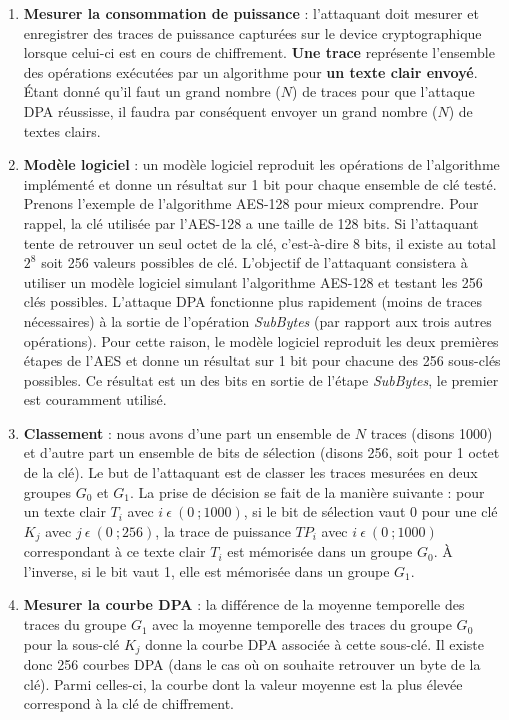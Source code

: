 \documentclass[oneside]{book}
\begin{document}
\begin{enumerate}
\item \textbf{Mesurer la consommation de puissance} : l'attaquant doit mesurer et enregistrer des traces de puissance capturées sur le device cryptographique lorsque celui-ci est en cours de chiffrement. \textbf{Une trace} représente l'ensemble des opérations exécutées par un algorithme pour \textbf{un texte clair envoyé}. Étant donné qu'il faut un grand nombre ($N$) de traces pour que l'attaque DPA réussisse, il faudra par conséquent envoyer un grand nombre ($N$) de textes clairs.
\item \textbf{Modèle logiciel} : un modèle logiciel reproduit les opérations de l’algorithme implémenté et donne un résultat sur 1 bit pour chaque ensemble de clé testé. Prenons l'exemple de l'algorithme AES-128 pour mieux comprendre. Pour rappel, la clé utilisée par l'AES-128 a une taille de 128 bits. Si l'attaquant tente de retrouver un seul octet de la clé, c'est-à-dire 8 bits, il existe au total $2^{8}$ soit 256 valeurs possibles de clé. L'objectif de l'attaquant consistera à utiliser un modèle logiciel simulant l'algorithme AES-128 et testant les 256 clés possibles. L'attaque DPA fonctionne plus rapidement (moins de traces nécessaires) à la sortie de l'opération \textit{SubBytes} (par rapport aux trois autres opérations). Pour cette raison, le modèle logiciel reproduit les deux premières étapes de l’AES et donne un résultat sur 1 bit pour chacune des 256 sous-clés possibles. Ce résultat est un des bits en sortie de l’étape \textit{SubBytes}, le premier est couramment utilisé.
\item \textbf{Classement} : nous avons d'une part un ensemble de $N$ traces (disons 1000) et d'autre part un ensemble de bits de sélection (disons 256, soit pour 1 octet de la clé). Le but de l'attaquant est de classer les traces mesurées en deux groupes $G_0$ et $G_1$. La prise de décision se fait de la manière suivante : pour un texte clair $T_i$ avec $i \ \epsilon \ (0 \ ;1000)$, si le bit de sélection vaut 0 pour une clé $K_j$ avec $j \ \epsilon \ (0 \ ; 256)$, la trace de puissance $TP_i$ avec $i \ \epsilon \ (0 \ ; 1000)$ correspondant à ce texte clair $T_i$ est mémorisée dans un groupe $G_0$. À l'inverse, si le bit vaut 1, elle est mémorisée dans un groupe $G_1$.
\item \textbf{Mesurer la courbe DPA} : la différence de la moyenne temporelle des traces du groupe $G_1$ avec la moyenne temporelle des traces du groupe $G_0$ pour la sous-clé $K_j$ donne la courbe DPA associée à cette sous-clé. Il existe donc 256 courbes DPA (dans le cas où on souhaite retrouver un byte de la clé). Parmi celles-ci, la courbe dont la valeur moyenne est la plus élevée correspond à la clé de chiffrement.
\end{enumerate}
\end{document}
